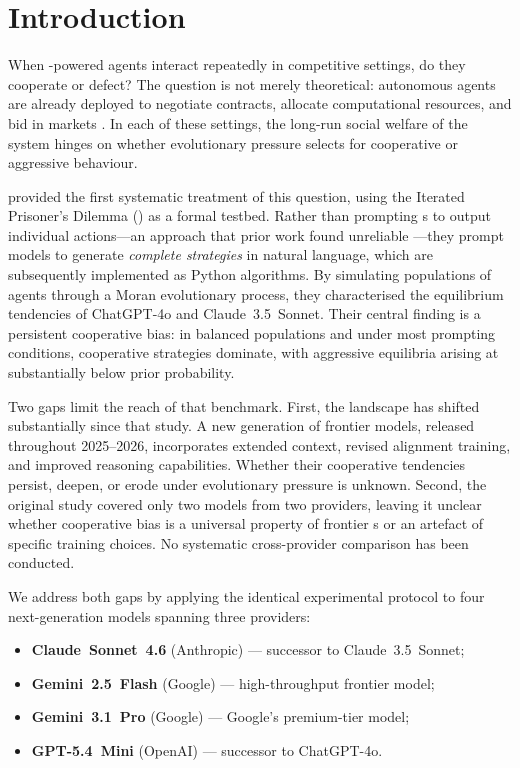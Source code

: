 \section{Introduction}

When \LLM-powered agents interact repeatedly in competitive settings, do
they cooperate or defect? The question is not merely theoretical: autonomous
\LLM agents are already deployed to negotiate contracts, allocate computational
resources, and bid in markets \cite{Wang2024_survey}. In each of these settings,
the long-run social welfare of the system hinges on whether evolutionary pressure
selects for cooperative or aggressive behaviour.

\citet{Willis2025_llm_ipd} provided the first systematic treatment
of this question, using the Iterated Prisoner's Dilemma (\IPD) as a formal
testbed. Rather than prompting \LLM{}s to output individual actions---an
approach that prior work found unreliable \cite{Fan2024_rational}---they prompt
models to generate \emph{complete strategies} in natural language, which are
subsequently implemented as Python algorithms. By simulating populations of
agents through a Moran evolutionary process, they characterised the equilibrium
tendencies of ChatGPT-4o and Claude~3.5~Sonnet. Their central finding is a
persistent cooperative bias: in balanced populations and under most prompting
conditions, cooperative strategies dominate, with aggressive equilibria arising
at substantially below prior probability.

Two gaps limit the reach of that benchmark. First, the \LLM landscape has
shifted substantially since that study. A new generation of frontier models,
released throughout 2025--2026, incorporates extended context, revised alignment
training, and improved reasoning capabilities. Whether their cooperative
tendencies persist, deepen, or erode under evolutionary pressure is unknown.
Second, the original study covered only two models from two providers, leaving
it unclear whether cooperative bias is a universal property of frontier \LLM{}s
or an artefact of specific training choices. No systematic cross-provider
comparison has been conducted.

We address both gaps by applying the identical experimental protocol to four
next-generation models spanning three providers:
\begin{itemize}
  \item \textbf{Claude~Sonnet~4.6} (Anthropic) --- successor to Claude~3.5~Sonnet;
  \item \textbf{Gemini~2.5~Flash} (Google) --- high-throughput frontier model;
  \item \textbf{Gemini~3.1~Pro} (Google) --- Google's premium-tier model;
  \item \textbf{GPT-5.4~Mini} (OpenAI) --- successor to ChatGPT-4o.
\end{itemize}

